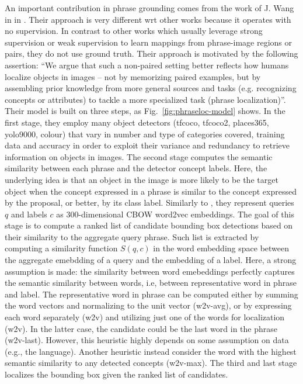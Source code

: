 An important contribution in phrase grounding comes from the work of
J. Wang in \etal{} in \cite{wang2019phrase}. Their approach is very
different wrt other works because it operates with no supervision. In
contrast to other works which usually leverage strong supervision or
weak supervision to learn mappings from phrase-image regions or pairs,
they do not use ground truth. Their approach is motivated by the
following assertion: ``We argue that such a non-paired setting better
reflects how humans localize objects in images -- not by memorizing
paired examples, but by assembling prior knowledge from more general
sources and tasks (e.g. recognizing concepts or attributes) to tackle
a more specialized task (phrase localization)''. Their model is built
on three steps, as Fig.~\ref{fig:phraseloc-model} shows. In the first
stage, they employ many object detectors (tfcoco, tfcoco2, places365,
yolo9000, colour) that vary in number and type of categories covered,
training data and accuracy in order to exploit their variance and
redundancy to retrieve information on objects in images. The second
stage computes the semantic similarity between each phrase and the
detector concept labels. Here, the underlying idea is that an object
in the image is more likely to be the target object when the concept
expressed in a phrase is similar to the concept expressed by the
proposal, or better, by its class label. Similarly to
\cite{chen2018knowledge}, they represent queries $q$ and labels $c$ as
$300$-dimensional CBOW word2vec embeddings. The goal of this stage is
to compute a ranked list of candidate bounding box detections based on
their similarity to the aggregate query phrase. Such list is extracted
by computing a similarity function $S(q, c)$ in the word embedding
space between the aggregate emebdding of a query and the embedding of
a label. Here, a strong assumption is made: the similarity between
word emebeddings perfectly captures the semantic similarity between
words, i.e, between representative word in phrase and label. The
representative word in phrase can be computed either by summing the
word vectors and normalizing to the unit vector (w2v-avg), or by
expressing each word separately (w2v) and utilizing just one of the
words for localization (w2v). In the latter case, the candidate could
be the last word in the phrase (w2v-last). However, this heuristic
highly depends on some assumption on data (e.g., the language).
Another heuristic instead consider the word with the highest semantic
similarity to any detected concepts (w2v-max). The third and last
stage localizes the bounding box given the ranked list of candidates.
